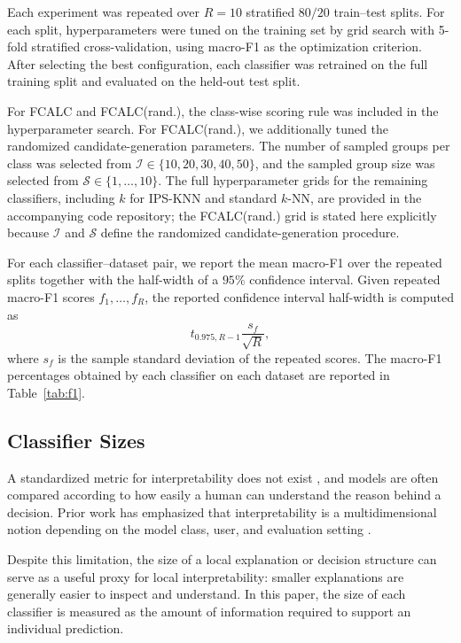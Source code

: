 \documentclass[a4paper,fleqn]{cas-sc}
\begin{document}
Each experiment was repeated over \(R=10\) stratified \(80/20\) train--test splits. For each split, hyperparameters were tuned on the training set by grid search with 5-fold stratified cross-validation, using macro-F1 as the optimization criterion. After selecting the best configuration, each classifier was retrained on the full training split and evaluated on the held-out test split.

For FCALC and FCALC(rand.), the class-wise scoring rule was included in the hyperparameter search. For FCALC(rand.), we additionally tuned the randomized candidate-generation parameters. The number of sampled groups per class was selected from
\(\mathcal{I}\in\{10,20,30,40,50\}\), and the sampled group size was selected from
\(\mathcal{S}\in\{1,\ldots,10\}\). The full hyperparameter grids for the remaining classifiers, including \(k\) for IPS-KNN and standard \(k\)-NN, are provided in the accompanying code repository; the FCALC(rand.) grid is stated here explicitly because \(\mathcal{I}\) and \(\mathcal{S}\) define the randomized candidate-generation procedure.

For each classifier--dataset pair, we report the mean macro-F1 over the repeated splits together with the half-width of a \(95\%\) confidence interval. Given repeated macro-F1 scores \(f_1,\ldots,f_R\), the reported confidence interval half-width is computed as
\begin{equation}
    t_{0.975,R-1}\frac{s_f}{\sqrt{R}},
\end{equation}
where \(s_f\) is the sample standard deviation of the repeated scores. The macro-F1 percentages obtained by each classifier on each dataset are reported in Table~\ref{tab:f1}.

\subsection{Classifier Sizes}
A standardized metric for interpretability does not exist \cite{kirmse2014large, lipton2018mythos, molnar2025}, and models are often compared according to how easily a human can understand the reason behind a decision. Prior work has emphasized that interpretability is a multidimensional notion depending on the model class, user, and evaluation setting \cite{lipton2018mythos, murdoch2019definitions}.

Despite this limitation, the size of a local explanation or decision structure can serve as a useful proxy for local interpretability: smaller explanations are generally easier to inspect and understand. In this paper, the size of each classifier is measured as the amount of information required to support an individual prediction.
\end{document}
